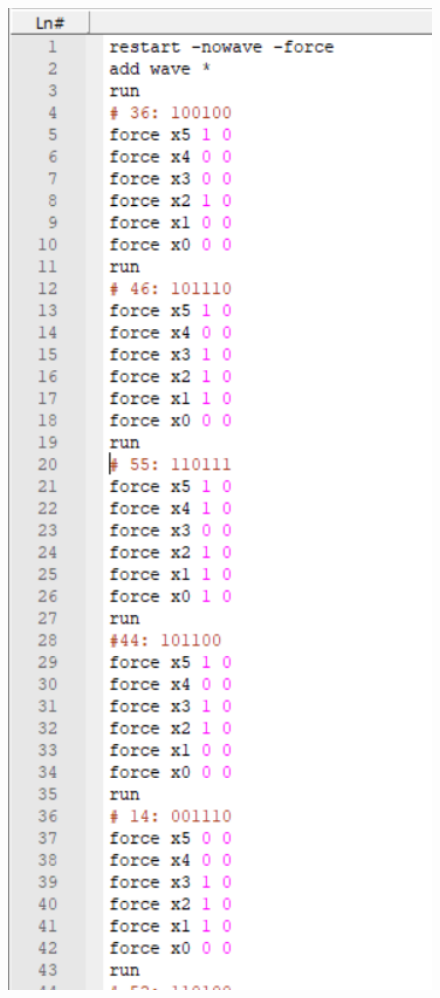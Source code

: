 \documentclass[]{article}
\begin{document}
\begin{minipage}{0.5\textwidth}
\begin{figure}[H]
	\centering
	\includegraphics[width=1\textwidth]{test_f1_1.png}
\end{figure}
\end{minipage}
\end{document}
